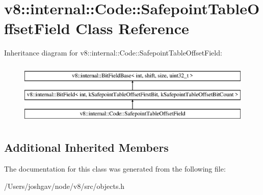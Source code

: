\hypertarget{classv8_1_1internal_1_1_code_1_1_safepoint_table_offset_field}{}\section{v8\+:\+:internal\+:\+:Code\+:\+:Safepoint\+Table\+Offset\+Field Class Reference}
\label{classv8_1_1internal_1_1_code_1_1_safepoint_table_offset_field}
Inheritance diagram for v8\+:\+:internal\+:\+:Code\+:\+:Safepoint\+Table\+Offset\+Field\+:\begin{figure}[H]
\begin{center}
\leavevmode
\includegraphics[height=3.000000cm]{classv8_1_1internal_1_1_code_1_1_safepoint_table_offset_field}
\end{center}
\end{figure}
\subsection*{Additional Inherited Members}


The documentation for this class was generated from the following file\+:\begin{DoxyCompactItemize}
\item 
/\+Users/joshgav/node/v8/src/objects.\+h\end{DoxyCompactItemize}
